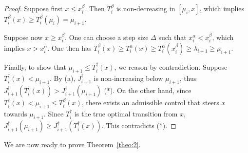 \documentclass[journal]{IEEEtran}
\theoremstyle{plain}
\theoremstyle{definition}
\theoremstyle{definition}
\begin{document}
\begin{proof}
  Suppose first $x \leq x^\beta_i$. Then $T_i^\beta$ is
  non-decreasing in $[\mu_i,x]$, which implies $T_i^\beta(x) \geq
  T_i^\beta(\mu_i) = \mu_{i+1}$. 

  Suppose now $x \geq x^\beta_i$. One can choose a step size
  $\Delta$ such that $x^\alpha_i < x^\beta_i$, which implies
  $x > x^\alpha_i$. One then has
  $T_i^\beta(x) \geq T_i^\alpha(x)\geq T_i^\alpha(x^\beta_i) \geq
  \lambda_{i+1} \geq \mu_{i+1}$.

  Finally, to show that $\mu_{i+1} \leq T_i^\dagger(x)$, we reason by
  contradiction. Suppose  $T_i^\dagger(x) < \mu_{i+1}$. By (a),
  $J^\dagger_{i+1}$ is non-increasing below $\mu_{i+1}$,
  thus $J^\dagger_{i+1}(T_i^\dagger(x)) >
  J^\dagger_{i+1}(\mu_{i+1})$ (*). On the other hand, since
  $T_i^\dagger(x) < \mu_{i+1} \leq T_i^\beta(x)$, there exists an
  admissible control that steers $x$ towards $\mu_{i+1}$. Since
  $T_i^\dagger$ is the true optimal transition from $x$,
  $J^\dagger_{i+1}(\mu_{i+1}) \geq
  J^\dagger_{i+1}(T_i^\dagger(x))$. This contradicts (*).
\end{proof}


We are now ready to prove Theorem~\ref{theo:2}.
\end{document}
